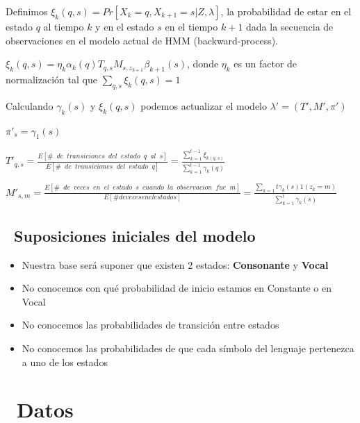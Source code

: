 \documentclass[]{article}
\begin{document}
Definimos \(\xi_{k}(q,s)=Pr[X_{k}=q,X_{k+1}=s|Z,\lambda]\), la
probabilidad de estar en el estado \(q\) al tiempo \(k\) y en el estado
\(s\) en el tiempo \(k+1\) dada la secuencia de observaciones en el
modelo actual de HMM (backward-process).

\(\xi_{k}(q,s)=\eta_{k}\alpha_{k}(q)T_{q,s}M_{s,z_{k+1}}\beta_{k+1}(s)\),
donde \(\eta_{k}\) es un factor de normalización tal que
\(\sum_{q,s}\xi_{k}(q,s)=1\)

Calculando \(\gamma_{k}(s)\) y \(\xi_{k}(q,s)\) podemos actualizar el
modelo \(\lambda'=(T',M',\pi')\)

\(\pi'_{s}=\gamma_{1}(s)\)

\(T'_{q,s}=\frac{E[\#\phantom{a}de\phantom{a}transiciones\phantom{a}del\phantom{a}estado\phantom{a}q \phantom{a}al\phantom{a}s]}{E[\#\phantom{a}de\phantom{a}transiciones\phantom{a}del\phantom{a}estado\phantom{a}q]}=\frac{\sum_{k=1}^{t-1}\xi_{k(q,s)}}{\sum_{k=1}^{t-1}\gamma_{k}(q)}\)

\(M'_{s,m}=\frac{E[\#\phantom{a}de\phantom{a}veces\phantom{a}en\phantom{a}el\phantom{a}estado\phantom{a}s\phantom{a}cuando\phantom{a}la\phantom{a}observacion\phantom{a}fue\phantom{a}m]}{E[\# de veces en el estado s]}=\frac{\sum_{k=1}{t}\gamma_{k}(s)1(z_{k}=m)}{\sum_{k=1}^{t}\gamma_{k}(s)}\)

\subsection{~Suposiciones iniciales del
modelo}\label{suposiciones-iniciales-del-modelo}

\begin{itemize}
\itemsep1pt\parskip0pt
\item
  Nuestra base será suponer que existen 2 estados: \textbf{Consonante} y
  \textbf{Vocal}\\
\item
  No conocemos con qué probabilidad de inicio estamos en Constante o en
  Vocal
\item
  No conocemos las probabilidades de transición entre estados
\item
  No conocemos las probabilidades de que cada símbolo del lenguaje
  pertenezca a uno de los estados
\end{itemize}

\section{~Datos}\label{datos}
\end{document}
